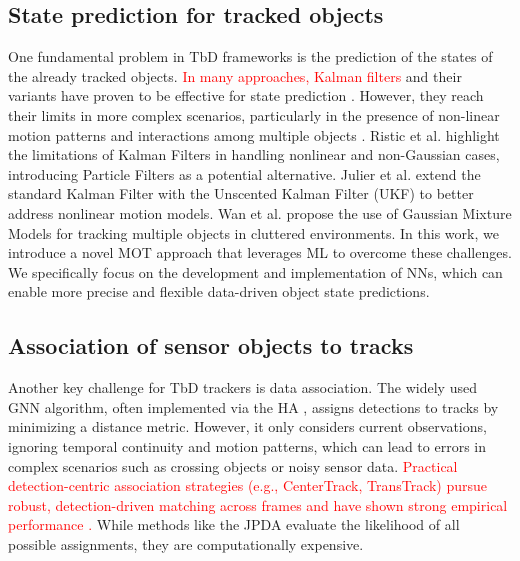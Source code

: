 \documentclass[letterpaper, 10 pt, journal, twoside]{IEEEtran}
\newcommand{\red}[1]{\textcolor{red}{#1}}
\begin{document}
\subsection{State prediction for tracked objects}
One fundamental problem in \ac{TbD} frameworks is the prediction of the states of the already tracked objects.
\red{In many approaches, Kalman filters} and their variants have proven to be effective for state prediction {\cite{KF_simple_cues.2022, KF_Bewley.2016, KF_framework.2013}}.
However, they reach their limits in more complex scenarios, particularly in the presence of non-linear motion patterns and interactions among multiple objects {\cite{KF_Ristic.2004,KF_Julier.2004,KF_Wan.2000}}.
Ristic et al. {\cite{KF_Ristic.2004}} highlight the limitations of Kalman Filters in handling nonlinear and non-Gaussian cases, introducing Particle Filters as a potential alternative.
Julier et al. {\cite{KF_Julier.2004}} extend the standard Kalman Filter with the Unscented Kalman Filter (UKF) to better address nonlinear motion models.
Wan et al. {\cite{KF_Wan.2000}} propose the use of Gaussian Mixture Models for tracking multiple objects in cluttered environments.
In this work, we introduce a novel \ac{MOT} approach that leverages \ac{ML} to overcome these challenges.
We specifically focus on the development and implementation of \acp{NN}, which can enable more precise and flexible data-driven object state predictions.

\subsection{Association of sensor objects to tracks}
Another key challenge for TbD trackers is data association.
The widely used \ac{GNN} algorithm, often implemented via the \ac{HA} {\cite{DA_hungarian.1955}}, assigns detections to tracks by minimizing a distance metric.
However, it only considers current observations, ignoring temporal continuity and motion patterns, which can lead to errors in complex scenarios such as crossing objects or noisy sensor data.
\red{Practical detection-centric association strategies (e.g., CenterTrack, TransTrack) pursue robust, detection-driven matching across frames and have shown strong empirical performance {\cite{Zhou2020CenterTrack,Sun2020TransTrack}}.}
While methods like the \ac{JPDA} {\cite{DA_JPDA.1993}} evaluate the likelihood of all possible assignments, they are computationally expensive.
\end{document}
